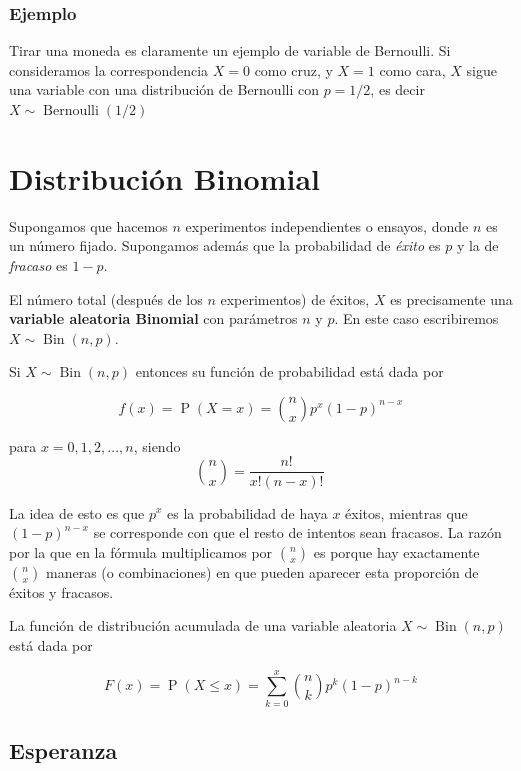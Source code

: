 \documentclass[]{book}
\theoremstyle{plain}
\theoremstyle{definition}
\theoremstyle{definition} %
\begin{document}
\hypertarget{ejemplo}{%
\subsubsection{Ejemplo}\label{ejemplo}}

Tirar una moneda es claramente un ejemplo de variable de Bernoulli. Si
consideramos la correspondencia \(X=0\) como cruz, y \(X=1\) como cara,
\(X\) sigue una variable con una distribución de Bernoulli con
\(p=1/2\), es decir
\(\displaystyle X\sim \operatorname {Bernoulli} (1/2)\)

\hypertarget{distribuciuxf3n-binomial}{%
\section{Distribución Binomial}\label{distribuciuxf3n-binomial}}

Supongamos que hacemos \(n\) experimentos independientes o ensayos,
donde \(n\) es un número fijado. Supongamos además que la probabilidad
de \emph{éxito} es \(p\) y la de \emph{fracaso} es \(1-p\).

El número total (después de los \(n\) experimentos) de éxitos, \(X\) es
precisamente una \textbf{variable aleatoria Binomial} con parámetros
\(n\) y \(p\). En este caso escribiremos
\(\displaystyle X\sim \operatorname {Bin} (n,p)\).

Si \(\displaystyle X\sim \operatorname {Bin} (n,p)\) entonces su función
de probabilidad está dada por

\[f(x)=\displaystyle \operatorname {P} (X=x)={n \choose x}p^{x}(1-p)^{n-x}\]

para \(\displaystyle x=0,1,2,\dots ,n\), siendo
\[\displaystyle \!{n \choose x}={\frac {n!}{x!(n-x)!}}\,\!\]

La idea de esto es que \(p^x\) es la probabilidad de haya \(x\) éxitos,
mientras que \((1-p)^{n-x}\) se corresponde con que el resto de intentos
sean fracasos. La razón por la que en la fórmula multiplicamos por
\(n \choose x\) es porque hay exactamente \(n \choose x\) maneras (o
combinaciones) en que pueden aparecer esta proporción de éxitos y
fracasos.

La función de distribución acumulada de una variable aleatoria
\(\displaystyle X\sim \operatorname {Bin} (n,p)\) está dada por

\[\displaystyle F(x)=\operatorname {P} (X\leq x)=\sum _{k=0}^{x}{n \choose k}p^{k}(1-p)^{n-k}\]

\hypertarget{esperanza-1}{%
\subsection{Esperanza}\label{esperanza-1}}
\end{document}
